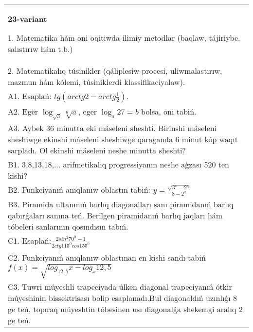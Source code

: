 \documentclass{article}
\begin{document}
\begin{tabular}{m{17cm}}
\textbf{23-variant}

1. Matematika hám oni oqitiwda ilimiy metodlar (baqlaw, tájiriybe, salıstırıw hám t.b.) \\
2. Matematikalıq túsinikler (qáliplesiw procesi, uliwmalastırıw, mazmun hám kólemi, túsiniklerdi klassifikaciyalaw). \\
A1. Esaplań: \(tg\left(arctg2 - arctg\frac{1}{2} \right) \). \\
A2. Eger \(\log_{\sqrt{3}}\sqrt[6]{a}\), eger \(\log_{a}27 = b\) bolsa, oni tabiń. \\
A3. Aybek 36 minutta eki máseleni sheshti. Birinshi máseleni sheshiwge ekinshi máseleni sheshiwge qaraganda 6 minut kóp waqıt sarpladı. Ol ekinshi máseleni neshe minutta sheshti? \\
B1. 3,8,13,18,... arifmetikalıq progressiyanın neshe aģzası 520 ten kishi? \\
B2. Funkciyanıń anıqlanıw oblastın tabiń: \(y = \frac{\sqrt{3^{x} - 27}}{8 - 2^{x}}\) \\
B3. Piramida ultanınıń barlıq diagonalları sanı piramidanıń barlıq qabırǵaları sanına teń. Berilgen piramidanıń barlıq jaqları hám tóbeleri sanlarının qosındısın tabıń. \\
C1. Esaplań:\(\frac{2sin^{2}70^{0} - 1}{2ctg115^{0}cos155^{0}}\) \\
C2. Funkciyanıń anıqlanıw oblastınan en kishi sandı tabiń \(f (x) = \sqrt{log_{12,5}x - log_{x}12,5}\) \\
C3. Tuwri múyeshli trapeciyada úlken diagonal trapeciyanıń ótkir múyeshinin bissektrisası bolip esaplanadı.Bul diagonaldıń uzınlıǵı 8 ge teń, topıraq múyeshtin tóbesinen usı diagonalǵa shekemgi aralıq 2 ge teń. \\

\end{tabular}
\vspace{1cm}
\end{document}
